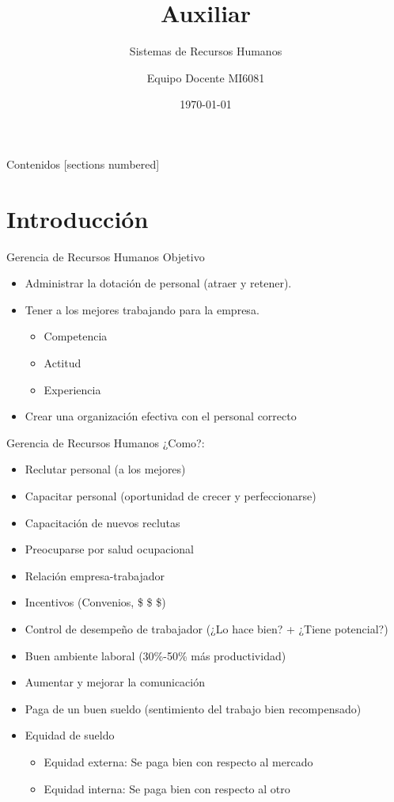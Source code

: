 \documentclass[10pt]{beamer}
\title{Auxiliar }
\subtitle{Sistemas de Recursos Humanos}
\date{\today}
\author{Equipo Docente MI6081}
\institute{Universidad de Chile - FCFM}
\begin{document}
\maketitle

\begin{frame}[allowframebreaks]{Contenidos}
  [sections numbered]
  \tableofcontents[hideallsubsections]
\end{frame}

\section{Introducción}

\begin{frame}[fragile]{Gerencia de Recursos Humanos}
Objetivo
\begin{itemize}
    \item Administrar la dotación de personal (atraer y retener).
    \item Tener a los mejores trabajando para la empresa.
    \begin{itemize}
        \item Competencia
        \item Actitud
        \item Experiencia
    \end{itemize}
    \item Crear una organización efectiva con el personal correcto
\end{itemize}
\end{frame}

\begin{frame}{Gerencia de Recursos Humanos}
¿Como?:
\begin{itemize}
    \item Reclutar personal (a los mejores)
    \item Capacitar personal (oportunidad de crecer y perfeccionarse)
    \item Capacitación de nuevos reclutas
    \item Preocuparse por salud ocupacional 
    \item Relación empresa-trabajador 
    \item Incentivos (Convenios, \$ \$ \$) 
    \item Control de desempeño de trabajador (¿Lo hace bien? + ¿Tiene potencial?)
    \item Buen ambiente laboral (30\%-50\% más productividad)
    \item Aumentar y mejorar la comunicación
    \item Paga de un buen sueldo (sentimiento del trabajo bien recompensado)
    \item Equidad de sueldo
    \begin{itemize}
        \item Equidad externa: Se paga bien con respecto al mercado
        \item Equidad interna: Se paga bien con respecto al otro
    \end{itemize}
\end{itemize}
\end{frame}
\end{document}
